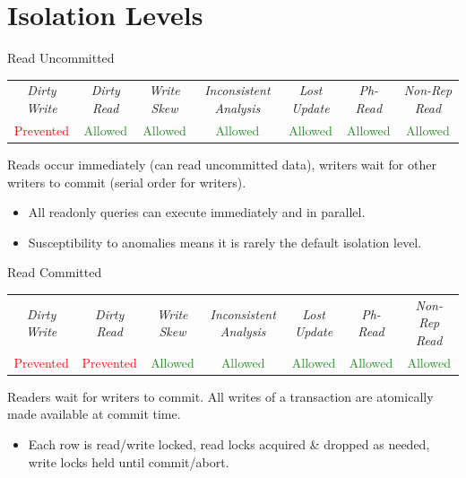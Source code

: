 \newcommand{\prevented}{\textcolor{red}{Prevented}}
\newcommand{\allowed}{\textcolor{ForestGreen}{Allowed}}
\section{Isolation Levels}
\begin{definitionbox}{Read Uncommitted}
    \begin{center}
        \begin{tabular}{c | c | c | c | c | c | c}
            \textit{Dirty Write} & \textit{Dirty Read} & \textit{Write Skew} & \textit{Inconsistent Analysis} & \textit{Lost Update} & \textit{Ph-Read} & \textit{Non-Rep Read}\\
            \prevented           & \allowed            & \allowed            & \allowed                       & \allowed             & \allowed              & \allowed \\
        \end{tabular}
    \end{center}
    Reads occur immediately (can read uncommitted data), writers wait for other writers to commit (serial order for writers).
    \begin{itemize}
        \item All readonly queries can execute immediately and in parallel.
        \item Susceptibility to anomalies means it is rarely the default isolation level.
    \end{itemize}
\end{definitionbox}

\begin{definitionbox}{Read Committed}
    \begin{center}
        \begin{tabular}{c | c | c | c | c | c | c}
            \textit{Dirty Write} & \textit{Dirty Read} & \textit{Write Skew} & \textit{Inconsistent Analysis} & \textit{Lost Update} & \textit{Ph-Read} & \textit{Non-Rep Read}\\
            \prevented           & \prevented          & \allowed            & \allowed                       & \allowed             & \allowed              & \allowed \\
        \end{tabular}
    \end{center}
    Readers wait for writers to commit. All writes of a transaction are atomically made available at commit time.
    \begin{itemize}
        \item Each row is read/write locked, read locks acquired \& dropped as needed, write locks held until commit/abort.
    \end{itemize}
\end{definitionbox}

